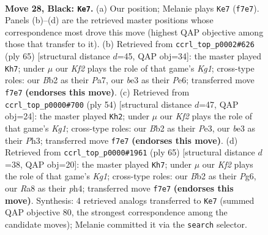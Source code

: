 \documentclass[11pt]{article}
\begin{document}
\clearpage

\begin{figure}[p]\centering
\begin{subfigure}{0.46\textwidth}\centering
\resizebox{\linewidth}{!}{%
\newchessgame
\chessboard[
  setfen={r7/2p2kpp/3p4/8/pP4Q1/4B1P1/Pb3PKP/1q6 b - - 2 28},
  showmover=false,
  pgfstyle=straightmove, color=movearrow, markmove={f7-e7}
]}
\caption{}
\end{subfigure}\hfill
\begin{subfigure}{0.46\textwidth}\centering
\resizebox{\linewidth}{!}{%
\newchessgame
\chessboard[
  setfen={6k1/pp3p2/4p1p1/3b3p/qP6/P1Q3P1/4PP1P/5BK1 b - - 1 33},
  showmover=false,
  pgfstyle=straightmove, color=movearrow, markmove={g8-h7}
]}
\caption{}
\end{subfigure}
\\[4pt]
\begin{subfigure}{0.46\textwidth}\centering
\resizebox{\linewidth}{!}{%
\newchessgame
\chessboard[
  setfen={6k1/5p1p/4p3/p2qp3/8/P1Q1P2P/5PP1/6K1 w - - 2 28},
  showmover=false,
  pgfstyle=straightmove, color=movearrow, markmove={g1-h2}
]}
\caption{}
\end{subfigure}\hfill
\begin{subfigure}{0.46\textwidth}\centering
\resizebox{\linewidth}{!}{%
\newchessgame
\chessboard[
  setfen={6k1/p4p2/1p1qb1pp/4p3/1P5P/P1Q1PB2/5PP1/6K1 b - - 6 33},
  showmover=false,
  pgfstyle=straightmove, color=movearrow, markmove={g8-h7}
]}
\caption{}
\end{subfigure}
\caption{\textbf{Move 28, Black: \texttt{Ke7}.} (a) Our position; Melanie plays \texttt{Ke7} (\texttt{f7e7}). Panels (b)--(d) are the retrieved master positions whose correspondence most drove this move (highest QAP objective among those that transfer to it). (b) Retrieved from \texttt{ccrl\_top\_p0002\#626} (ply 65) [structural distance $d$=45, QAP obj=34]: the master played \texttt{Kh7}; under $\mu$ our \emph{Kf2} plays the role of that game's \emph{Kg1}; cross-type roles: our \emph{B}b2 as their \emph{P}a7, our \emph{b}e3 as their \emph{P}e6; transferred move \texttt{f7e7} \textbf{(endorses this move)}. (c) Retrieved from \texttt{ccrl\_top\_p0000\#700} (ply 54) [structural distance $d$=47, QAP obj=24]: the master played \texttt{Kh2}; under $\mu$ our \emph{Kf2} plays the role of that game's \emph{Kg1}; cross-type roles: our \emph{B}b2 as their \emph{P}e3, our \emph{b}e3 as their \emph{P}h3; transferred move \texttt{f7e7} \textbf{(endorses this move)}. (d) Retrieved from \texttt{ccrl\_top\_p0000\#1961} (ply 65) [structural distance $d$=38, QAP obj=20]: the master played \texttt{Kh7}; under $\mu$ our \emph{Kf2} plays the role of that game's \emph{Kg1}; cross-type roles: our \emph{B}b2 as their \emph{P}g6, our \emph{R}a8 as their \emph{p}h4; transferred move \texttt{f7e7} \textbf{(endorses this move)}. Synthesis: 4 retrieved analogs transferred to \texttt{Ke7} (summed QAP objective 80, the strongest correspondence among the candidate moves); Melanie committed it via the \texttt{search} selector.}
\label{fig:thought-m55}
\end{figure}
\end{document}
